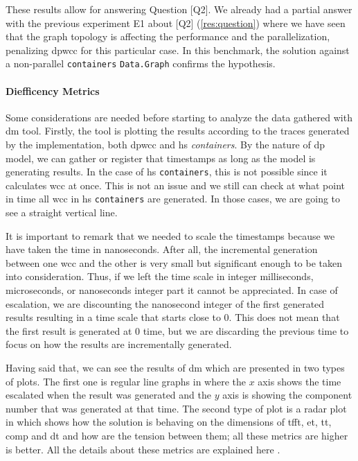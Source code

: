 These results allow for answering Question [Q2].
We already had a partial answer with the previous experiment E1 about [Q2] (\autoref{res:question}) where we have seen that the graph topology is affecting the performance and the parallelization, penalizing \acrshort{dpwcc} for this particular case. In this benchmark, the solution against a non-parallel \texttt{containers} \texttt{Data.Graph} confirms the hypothesis. 

\paragraph{Diefficency Metrics}\label{sub:sub:sec:e2}
Some considerations are needed before starting to analyze the data gathered with \acrshort{dm} tool. Firstly, the tool is plotting the results according to the traces generated by the implementation, both \acrshort{dpwcc} and \acrshort{hs} \emph{containers}. By the nature of \acrshort{dp} model, we can gather or register that timestamps as long as the model is generating results. In the case of \acrshort{hs} \texttt{containers}, this is not possible since it calculates \acrshort{wcc} at once. This is not an issue and we still can check at what point in time all \acrshort{wcc} in \acrshort{hs} \texttt{containers} are generated. In those cases, we are going to see a straight vertical line. 

It is important to remark that we needed to scale the timestamps because we have taken the time in nanoseconds. After all, the incremental generation between one \acrshort{wcc} and the other is very small but significant enough to be taken into consideration. Thus, if we left the time scale in integer milliseconds, microseconds, or nanoseconds integer part it cannot be appreciated. In case of escalation, we are discounting the nanosecond integer of the first generated results resulting in a time scale that starts close to $0$. This does not mean that the first result is generated at $0$ time, but we are discarding the previous time to focus on how the results are incrementally generated.

Having said that, we can see the results of \acrshort{dm} which are presented in two types of plots. The first one is regular line graphs in where the $x$ axis shows the time escalated when the result was generated and the $y$ axis is showing the component number that was generated at that time. The second type of plot is a radar plot in which shows how the solution is behaving on the dimensions of  \acrfull{tfft}, \acrfull{et}, \acrfull{tt}, \acrfull{comp} and \acrfull{dt} and how are the tension between them; all these metrics are higher is better. All the details about these metrics are explained here \cite{diefpaper}.

